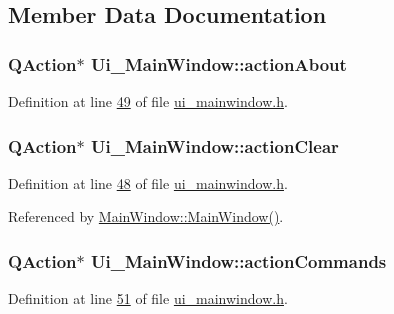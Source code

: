 \subsection{Member Data Documentation}
\hypertarget{a00027_abdf2b43167c2cd0d3405f90b8c30e934}{
\subsubsection[{action\+About}]{\setlength{\rightskip}{0pt plus 5cm}Q\+Action$\ast$ Ui\+\_\+\+Main\+Window\+::action\+About}}\label{a00027_abdf2b43167c2cd0d3405f90b8c30e934}


Definition at line \hyperlink{a00052_source_l00049}{49} of file \hyperlink{a00052_source}{ui\+\_\+mainwindow.\+h}.

\hypertarget{a00027_ac8539dcd87955047877cb256aff60453}{
\subsubsection[{action\+Clear}]{\setlength{\rightskip}{0pt plus 5cm}Q\+Action$\ast$ Ui\+\_\+\+Main\+Window\+::action\+Clear}}\label{a00027_ac8539dcd87955047877cb256aff60453}


Definition at line \hyperlink{a00052_source_l00048}{48} of file \hyperlink{a00052_source}{ui\+\_\+mainwindow.\+h}.



Referenced by \hyperlink{a00038_source_l00024}{Main\+Window\+::\+Main\+Window()}.

\hypertarget{a00027_a3dccdc21d3df68b86550093b5e3c0356}{
\subsubsection[{action\+Commands}]{\setlength{\rightskip}{0pt plus 5cm}Q\+Action$\ast$ Ui\+\_\+\+Main\+Window\+::action\+Commands}}\label{a00027_a3dccdc21d3df68b86550093b5e3c0356}


Definition at line \hyperlink{a00052_source_l00051}{51} of file \hyperlink{a00052_source}{ui\+\_\+mainwindow.\+h}.

